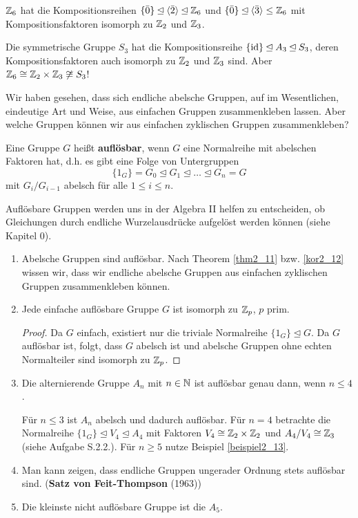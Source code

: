 \begin{beispiel}
	$\mathbb{Z}_6$ hat die Kompositionsreihen $\{\bar{0}\} \unlhd \langle \bar{2} \rangle \unlhd \mathbb{Z}_6$ und $\{\bar{0}\} \unlhd \langle \bar{3} \rangle \leq \mathbb{Z}_6$ mit Kompositionsfaktoren isomorph zu $\mathbb{Z}_2$ und $\mathbb{Z}_3$.
	
	Die symmetrische Gruppe $S_3$ hat die Kompositionsreihe $\{\mathrm{id}\} \unlhd A_3 \unlhd S_3$, deren Kompositionsfaktoren auch isomorph zu $\mathbb{Z}_2$ und $\mathbb{Z}_3$ sind. Aber $\mathbb{Z}_6 \cong \mathbb{Z}_2 \times \mathbb{Z}_3 \not\cong S_3$!
\end{beispiel}
\begin{leftbar}
	Wir haben gesehen, dass sich endliche abelsche Gruppen, auf im Wesentlichen, eindeutige Art und Weise, aus einfachen Gruppen zusammenkleben lassen. Aber welche Gruppen können wir aus einfachen zyklischen Gruppen zusammenkleben?
\end{leftbar}
\begin{definition}
	Eine Gruppe $G$ heißt \textbf{auflösbar}, wenn $G$ eine Normalreihe mit abelschen Faktoren hat, d.h. es gibt eine Folge von Untergruppen
	\[\{1_G\} = G_0 \unlhd G_1 \unlhd \dots \unlhd G_n = G\]
	mit $G_i/G_{i-1}$ abelsch für alle $1 \leq i \leq n$.
\end{definition}
\begin{rem}
	Auflösbare Gruppen werden uns in der Algebra II helfen zu entscheiden, ob Gleichungen durch endliche Wurzelausdrücke aufgelöst werden können (siehe Kapitel 0).
\end{rem}
\begin{beispiel}\label{beispiel2_20}
	\begin{enumerate}[label=(\arabic*)]
		\item Abelsche Gruppen sind auflösbar. Nach Theorem \ref{thm2_11} bzw. \ref{kor2_12} wissen wir, dass wir endliche abelsche Gruppen aus einfachen zyklischen Gruppen zusammenkleben können.
		\item Jede einfache auflösbare Gruppe $G$ ist isomorph zu $\mathbb{Z}_p$, $p$ prim.
		\begin{proof}
			Da $G$ einfach, existiert nur die triviale Normalreihe $\{1_G\} \unlhd G$. Da $G$ auflösbar ist, folgt, dass $G$ abelsch ist und abelsche Gruppen ohne echten Normalteiler sind isomorph zu $\mathbb{Z}_p$.
		\end{proof}
		\item Die alternierende Gruppe $A_n$ mit $n \in \mathbb{N}$ ist auflösbar genau dann, wenn $n \leq 4$.
		\begin{inlproof}
			Für $n \leq 3$ ist $A_n$ abelsch und dadurch auflösbar. Für $n = 4$ betrachte die Normalreihe $\{1_G\} \unlhd V_4 \unlhd A_4$ mit Faktoren $V_4 \cong \mathbb{Z}_2 \times \mathbb{Z}_2$ und $A_4 / V_4 \cong \mathbb{Z}_3$ (siehe Aufgabe S.2.2.). Für $n \geq 5$ nutze Beispiel \ref{beispiel2_13}.
		\end{inlproof}
		\item Man kann zeigen, dass endliche Gruppen ungerader Ordnung stets auflösbar sind. (\textbf{Satz von Feit-Thompson} (1963))
		\item Die kleinste nicht auflösbare Gruppe ist die $A_5$.
	\end{enumerate}
\end{beispiel}
